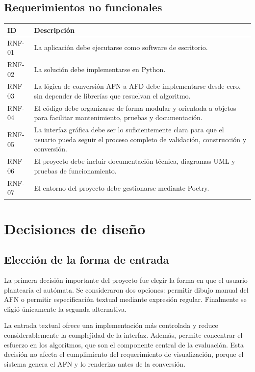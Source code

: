 \documentclass[12pt]{article}
\begin{document}
\subsection{Requerimientos no funcionales}

\begin{longtable}{p{1.5cm} p{11.8cm}}
\toprule
\textbf{ID} & \textbf{Descripción} \\
\midrule
RNF-01 & La aplicación debe ejecutarse como software de escritorio. \\
RNF-02 & La solución debe implementarse en Python. \\
RNF-03 & La lógica de conversión AFN a AFD debe implementarse desde cero, sin depender de librerías que resuelvan el algoritmo. \\
RNF-04 & El código debe organizarse de forma modular y orientada a objetos para facilitar mantenimiento, pruebas y documentación. \\
RNF-05 & La interfaz gráfica debe ser lo suficientemente clara para que el usuario pueda seguir el proceso completo de validación, construcción y conversión. \\
RNF-06 & El proyecto debe incluir documentación técnica, diagramas UML y pruebas de funcionamiento. \\
RNF-07 & El entorno del proyecto debe gestionarse mediante Poetry. \\
\bottomrule
\end{longtable}

\section{Decisiones de diseño}

\subsection{Elección de la forma de entrada}

La primera decisión importante del proyecto fue elegir la forma en que el usuario plantearía el autómata. Se consideraron dos opciones: permitir dibujo manual del AFN o permitir especificación textual mediante expresión regular. Finalmente se eligió únicamente la segunda alternativa.

La entrada textual ofrece una implementación más controlada y reduce considerablemente la complejidad de la interfaz. Además, permite concentrar el esfuerzo en los algoritmos, que son el componente central de la evaluación. Esta decisión no afecta el cumplimiento del requerimiento de visualización, porque el sistema genera el AFN y lo renderiza antes de la conversión.
\end{document}
